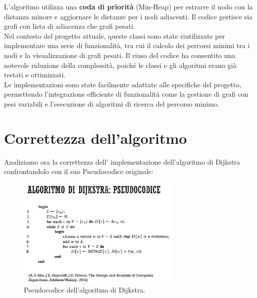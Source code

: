 \documentclass[a4paper,12pt]{article}
\begin{document}
L'algoritmo utilizza una \textbf{coda di priorità} (Min-Heap) per estrarre il nodo con 
la distanza minore e aggiornare le distanze per i nodi adiacenti. Il codice gestisce sia grafi 
con lista di adiacenza che grafi pesati.\\

Nel contesto del progetto attuale, queste classi sono state riutilizzate per 
implementare una serie di funzionalità, tra cui il calcolo dei percorsi minimi tra 
i nodi e la visualizzazione di grafi pesati. Il riuso del codice ha consentito una 
notevole riduzione della complessità, poiché le classi e gli algoritmi erano già 
testati e ottimizzati.\\

Le implementazioni sono state facilmente adattate alle specifiche del progetto, 
permettendo l'integrazione efficiente di funzionalità come la gestione di grafi con 
pesi variabili e l'esecuzione di algoritmi di ricerca del percorso minimo.


\section{Correttezza dell'algoritmo}

Analiziamo ora la correttezza dell' implementazione dell'algoritmo di Dijkstra 
confrontandolo con il suo Pseudocodice originale: 

\begin{figure}[h!]
    \centering
    \includegraphics[width=0.7\textwidth]{Images/DijkstraPseudoCode.png}
    \caption{Pseudocodice dell'algoritmo di Dijkstra.}\label{fig:Pseudocodice Dijkstra}
\end{figure}
\end{document}
